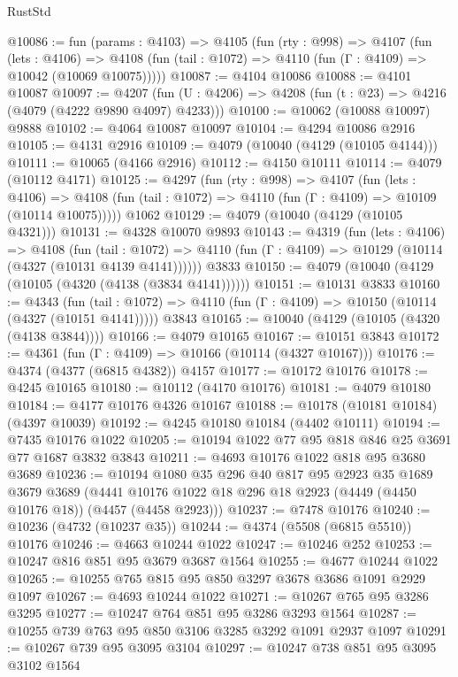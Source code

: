 \begin{lexlean}{RustStd}
\begin{coremodule}
{\begin{coremodule}
{{{{{{{{{{{{{{@10086 := fun (params : @4103) =>
  @4105
    (fun (rty : @998) =>
    @4107
      (fun (lets : @4106) =>
      @4108 (fun (tail : @1072) => @4110 (fun (Γ : @4109) => @10042 (@10069 @10075)))))
@10087 := @4104 @10086
@10088 := @4101 @10087
@10097 := @4207
    (fun (U : @4206) => @4208 (fun (t : @23) => @4216 (@4079 (@4222 @9890 @4097) @4233)))
@10100 := @10062 (@10088 @10097) @9888
@10102 := @4064 @10087 @10097
@10104 := @4294 @10086 @2916
@10105 := @4131 @2916
@10109 := @4079 (@10040 (@4129 (@10105 @4144)))
@10111 := @10065 (@4166 @2916)
@10112 := @4150 @10111
@10114 := @4079 (@10112 @4171)
@10125 := @4297
    (fun (rty : @998) =>
    @4107
      (fun (lets : @4106) =>
      @4108 (fun (tail : @1072) => @4110 (fun (Γ : @4109) => @10109 (@10114 @10075)))))
    @1062
@10129 := @4079 (@10040 (@4129 (@10105 @4321)))
@10131 := @4328 @10070 @9893
@10143 := @4319
    (fun (lets : @4106) =>
    @4108
      (fun (tail : @1072) =>
      @4110 (fun (Γ : @4109) => @10129 (@10114 (@4327 (@10131 @4139 @4141))))))
    @3833
@10150 := @4079 (@10040 (@4129 (@10105 (@4320 (@4138 (@3834 @4141))))))
@10151 := @10131 @3833
@10160 := @4343
    (fun (tail : @1072) => @4110 (fun (Γ : @4109) => @10150 (@10114 (@4327 (@10151 @4141)))))
    @3843
@10165 := @10040 (@4129 (@10105 (@4320 (@4138 @3844))))
@10166 := @4079 @10165
@10167 := @10151 @3843
@10172 := @4361 (fun (Γ : @4109) => @10166 (@10114 (@4327 @10167)))
@10176 := @4374 (@4377 (@6815 @4382)) @4157
@10177 := @10172 @10176
@10178 := @4245 @10165
@10180 := @10112 (@4170 @10176)
@10181 := @4079 @10180
@10184 := @4177 @10176 @4326 @10167
@10188 := @10178 (@10181 @10184) (@4397 @10039)
@10192 := @4245 @10180 @10184 (@4402 @10111)
@10194 := @7435 @10176 @1022
@10205 := @10194 @1022 @77 @95 @818 @846 @25 @3691 @77 @1687 @3832 @3843
@10211 := @4693 @10176 @1022 @818 @95 @3680 @3689
@10236 := @10194
    @1080
    @35
    @296
    @40
    @817
    @95
    @2923
    @35
    @1689
    @3679
    @3689
    (@4441 @10176 @1022 @18 @296 @18 @2923 (@4449 (@4450 @10176 @18)) (@4457 (@4458 @2923)))
@10237 := @7478 @10176
@10240 := @10236 (@4732 (@10237 @35))
@10244 := @4374 (@5508 (@6815 @5510)) @10176
@10246 := @4663 @10244 @1022
@10247 := @10246 @252
@10253 := @10247 @816 @851 @95 @3679 @3687 @1564
@10255 := @4677 @10244 @1022
@10265 := @10255 @765 @815 @95 @850 @3297 @3678 @3686 @1091 @2929 @1097
@10267 := @4693 @10244 @1022
@10271 := @10267 @765 @95 @3286 @3295
@10277 := @10247 @764 @851 @95 @3286 @3293 @1564
@10287 := @10255 @739 @763 @95 @850 @3106 @3285 @3292 @1091 @2937 @1097
@10291 := @10267 @739 @95 @3095 @3104
@10297 := @10247 @738 @851 @95 @3095 @3102 @1564
}}}}}}}}}}}}}}
\end{coremodule}}
\end{coremodule}
\end{lexlean}

